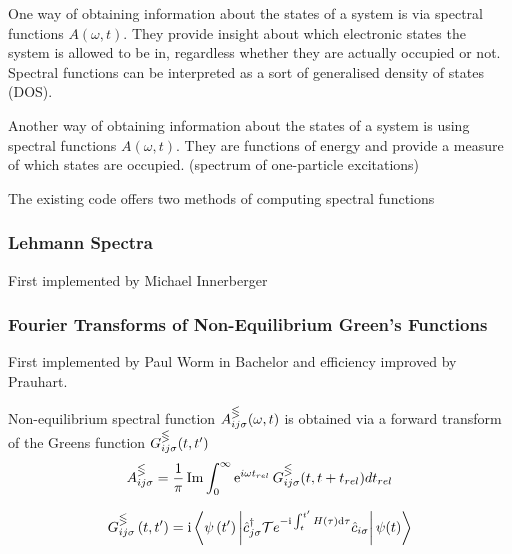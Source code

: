 One way of obtaining information about the states of a system is via spectral functions $A(\omega, t)$. They provide insight about which electronic states the system is allowed to be in, regardless whether they are actually occupied or not. Spectral functions can be interpreted as a sort of generalised density of states (DOS).


\medskip
Another way of obtaining information about the states of a system is using spectral functions $A(\omega, t)$. They are functions of energy and provide a measure of which states are occupied.
(spectrum of one-particle excitations)

The existing code offers two methods of computing spectral functions \cite{spectral_function}

\subsubsection{Lehmann Spectra}
First implemented by Michael Innerberger

\subsubsection{Fourier Transforms of Non-Equilibrium Green's Functions}
First implemented by Paul Worm in Bachelor and efficiency improved by Prauhart.

Non-equilibrium spectral function $A_{ij\sigma}^\gtlt(\omega, t)$ is obtained via a forward transform of the Greens function $G_{ij\sigma}^\gtlt (t,t')$
\begin{equation}
    A_{ij\sigma}^\gtlt = \frac{1}{\pi} \operatorname{Im}\int_0^\infty \operatorname{e}^{i\omega t_{rel}} G_{ij\sigma}^\gtlt (t,t+t_{rel}) dt_{rel}
\end{equation}

\begin{equation}
    G_{i j \sigma}^{\gtlt}\left(t, t^{\prime}\right)=\mathrm{i}\left\langle\psi\left(t^{\prime}\right)\left|\hat{c}_{j \sigma}^{\dagger} \mathcal{T} e^{-\mathrm{i} \int_{t}^{t^{\prime}} H(\tau) \mathrm{d} \tau} \hat{c}_{i \sigma}\right| \psi(t)\right\rangle
\end{equation}
